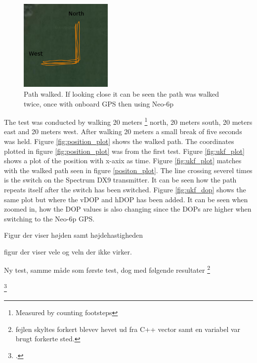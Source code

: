 \begin{figure}[H]
\centering
    \includegraphics[width=0.4\textwidth]	{graphics/test_walked_90deg.png}
	  \caption{Path walked. If looking close it can be seen the path was walked twice, once with onboard GPS then using Neo-6p}
    \label{fig:qground_station_dop}
\end{figure}
The test was conducted by walking 20 meters \footnote{Measured by counting footsteps} north, 20 meters south, 20 meters east and 20 meters west. After walking 20 meters a small break of five seconds was held. Figure \ref{fig:position_plot} shows the walked path.
The coordinates plotted in figure \ref{fig:position_plot} was from the first test. Figure \ref{fig:ukf_plot} shows a plot of the position with x-axix as time.
Figure \ref{fig:ukf_plot} matches with the walked path seen in figure \ref{positon_plot}. The line crossing severel times is the switch on the Spectrum DX9 transmitter. It can be seen how the path repeats itself after the switch has been switched.
Figure \ref{fig:ukf_dop} shows the same plot but where the vDOP and hDOP has been added. It can be seen when zoomed in, how the DOP values is also changing since the DOPs are higher when switching to the Neo-6p GPS.




Figur der viser højden samt højdehastigheden

figur der viser vele og veln der ikke virker.

Ny test, samme måde som første test, dog med følgende resultater \footnote{fejlen skyltes forkert blevev hevet ud fra C++ vector samt en variabel var brugt forkerte sted.}

\footcite{kelddueholmmikkellaurentziusannab.o.jensen2015}




